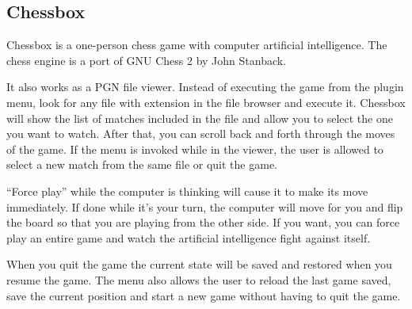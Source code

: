 \subsection{Chessbox}
Chessbox is a one-person chess game with computer artificial intelligence. 
The chess engine is a port of GNU Chess 2 by John Stanback.

It also works as a PGN file viewer. Instead of executing the game from the
plugin menu, look for any file with  extension in the file browser
and execute it. Chessbox will show the list of matches included in the file
and allow you to select the one you want to watch. After that, you can scroll
back and forth through the moves of the game. If the menu is invoked while in
the viewer, the user is allowed to select a new match from the same file or
quit the game.

``Force play'' while the computer is thinking will cause it to make its move
immediately.  If done while it's your turn, the computer will move
for you and flip the board so that you are playing from the other side.  If you
want, you can force play an entire game and watch the artificial intelligence
 fight against itself.

When you quit the game the current state will be saved and restored when
you resume the game. The menu also allows the user to reload the last game
saved, save the current position and start a new game without having to quit
the game.

